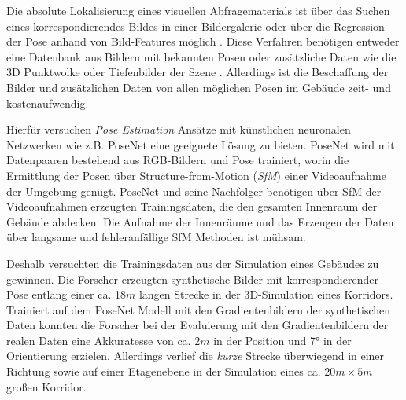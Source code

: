 Die absolute Lokalisierung eines visuellen Abfragematerials ist über das Suchen eines korrespondierendes Bildes in einer Bildergalerie oder über die Regression der Pose anhand von Bild-Features möglich \cite{piascoSurveyVisualBasedLocalization2018}. Diese Verfahren benötigen entweder eine Datenbank aus Bildern mit bekannten Posen \cite{zhangImageBasedLocalization2006, arandjelovicThreeThingsEveryone2012, radenovicCNNImageRetrieval2016} oder zusätzliche Daten wie die 3D Punktwolke \cite{irscharaStructurefrommotionPointClouds2009, liWorldwidePoseEstimation2012, svarmCityScaleLocalizationCameras2017} oder Tiefenbilder der Szene \cite{shottonSceneCoordinateRegression2013a}. Allerdings ist die Beschaffung der Bilder und zusätzlichen Daten von allen möglichen Posen im Gebäude zeit- und kostenaufwendig.


Hierfür versuchen \textit{Pose Estimation} Ansätze mit künstlichen neuronalen Netzwerken wie z.B. PoseNet \cite{kendallPoseNetConvolutionalNetwork2015} eine geeignete Lösung zu bieten. PoseNet wird mit Datenpaaren bestehend aus RGB-Bildern und Pose trainiert, worin die Ermittlung der Posen über Structure-from-Motion (\textit{SfM}) einer Videoaufnahme der Umgebung genügt. PoseNet und seine Nachfolger \cite{kendallModellingUncertaintyDeep2015a, walchImagebasedLocalizationUsing2016,  kendallGeometricLossFunctions2017,  clarkVidLocDeepSpatioTemporal2017} benötigen über SfM der Videoaufnahmen erzeugten Trainingsdaten, die den gesamten Innenraum der Gebäude abdecken. Die Aufnahme der Innenräume und das Erzeugen der Daten über langsame und fehleranfällige SfM Methoden ist mühsam.

Deshalb versuchten \citet{acharyaBIMPoseNetIndoorCamera2019} die Trainingsdaten aus der Simulation eines Gebäudes zu gewinnen. Die Forscher erzeugten synthetische Bilder mit korrespondierender Pose entlang einer ca. 18$m$ langen Strecke in der 3D-Simulation eines Korridors. Trainiert auf dem PoseNet Modell mit den Gradientenbildern der synthetischen Daten konnten die Forscher \citet{acharyaBIMPoseNetIndoorCamera2019} bei der Evaluierung mit den Gradientenbildern der realen Daten eine Akkuratesse von ca. $2m$ in der Position und 7° in der Orientierung erzielen. Allerdings verlief die \textit{kurze} Strecke überwiegend in einer Richtung sowie auf einer Etagenebene in der Simulation eines ca. $20m \times 5m$ großen Korridor.

